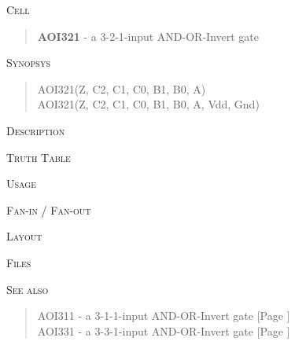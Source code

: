 
\label{AOI321}
\textsc{Cell}
\begin{quote}
    \textbf{AOI321} - a 3-2-1-input AND-OR-Invert gate
\end{quote}

\textsc{Synopsys}
\begin{quote}
    AOI321(Z, C2, C1, C0, B1, B0, A) \\
    AOI321(Z, C2, C1, C0, B1, B0, A, Vdd, Gnd)
\end{quote}

\textsc{Description}

%

\textsc{Truth Table}


\textsc{Usage}

\textsc{Fan-in / Fan-out}

\textsc{Layout}

\textsc{Files}

\textsc{See also}
\begin{quote}
    AOI311 - a 3-1-1-input AND-OR-Invert gate [Page \pageref{AOI311}] \\
    AOI331 - a 3-3-1-input AND-OR-Invert gate [Page \pageref{AOI331}]
\end{quote}

